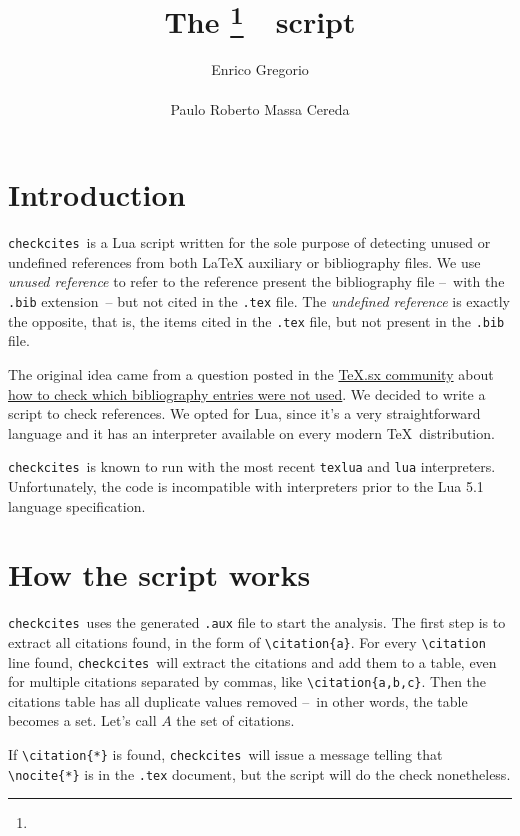 \documentclass[12pt,a4paper]{article}
\title{The \checkcites\footnote{\version}\ \ script}
\author{%
  Enrico Gregorio\\\email{Enrico dot Gregorio at univr dot it}\\[3ex]
  Paulo Roberto Massa Cereda\\\email{cereda at users dot sf dot net}%
}
\date{}
\newcommand{\checkcites}{\texttt{checkcites}}
\newenvironment{infoblock}[1]
  {\par\addvspace{\medskipamount}
   \begin{tcolorbox}[colframe=DarkTurquoise,coltitle=black,fonttitle=\bfseries,title=#1]}
  {\end{tcolorbox}\addvspace{\medskipamount}}
\begin{document}
\maketitle

\tableofcontents

\section{Introduction}
\label{sec:intro}

\checkcites\ is a Lua script written for the sole purpose of detecting
unused or undefined references from both \LaTeX{} auxiliary or
bibliography files. We use \emph{unused reference} to refer to the
reference present the bibliography file --~with the \verb|.bib|
extension~-- but not cited in the \verb|.tex| file. The
\emph{undefined reference} is exactly the opposite, that is, the items
cited in the \texttt{.tex} file, but not present in the \verb|.bib|
file.

The original idea came from a question posted in the
\href{http://tex.stackexchange.com}{TeX.sx community} about
\href{http://tex.stackexchange.com/questions/43276}{how to check which
bibliography entries were not used}. We decided to write a script to
check references. We opted for Lua, since it's a very straightforward
language and it has an interpreter available on every modern \TeX\
distribution.

\begin{infoblock}{Attention!}
\checkcites\ is known to run with the most recent \verb|texlua| and
\verb|lua| interpreters. Unfortunately, the code is incompatible with
interpreters prior to the Lua 5.1 language specification.
\end{infoblock}

\section{How the script works}
\label{sec:howto}

\checkcites\ uses the generated \verb|.aux| file to start the
analysis. The first step is to extract all citations found, in the
form of \verb|\citation{a}|. For every \verb|\citation| line found,
\checkcites\ will extract the citations and add them to a table, even
for multiple citations separated by commas, like
\verb|\citation{a,b,c}|. Then the citations table has all duplicate
values removed --~in other words, the table becomes a set.  Let's call
$A$ the set of citations.

\begin{infoblock}{Attention!}
If \verb|\citation{*}| is found, \checkcites\ will issue a message
telling that \verb|\nocite{*}| is in the \verb|.tex| document, but
the script will do the check nonetheless.
\end{infoblock}
\end{document}
